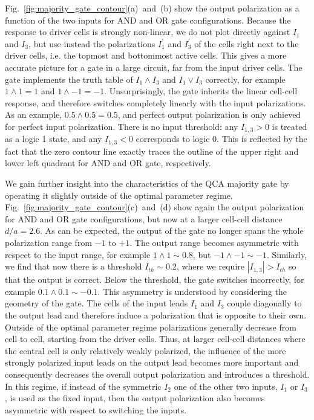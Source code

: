 Fig.~\ref{fig:majority_gate_contour}(a)~and~(b) show the output polarization as
a function of the two inputs for AND and OR gate configurations. Because the
response to driver cells is strongly non-linear, we do not plot directly against
$I_1$ and $I_3$, but use instead the polarizations $I_1^{\prime}$ and
$I_3^{\prime}$ of the cells right next to the driver cells, i.e.  the topmost
and bottommost active cells. This gives a more accurate picture for a gate in a
large circuit, far from the input driver cells. The gate implements the truth
table of $I_1 \land I_3$ and $I_1 \lor I_3$ correctly, for example $1 \land 1 =
1$ and $1 \land -1 = -1$. Unsurprisingly, the gate inherits the linear cell-cell
response, and therefore switches completely linearly with the input
polarizations. As an example, $0.5 \land 0.5 = 0.5$, and perfect output
polarization is only achieved for perfect input polarization. There is no input
threshold: any $I_{1,3} > 0$ is treated as a logic 1 state, and any $I_{1,3} <
0$ corresponds to logic 0. This is reflected by the fact that the zero contour
line exactly traces the outline of the upper right and lower left quadrant for
AND and OR gate, respectively.

We gain further insight into the characteristics of the QCA majority gate by
operating it slightly outside of the optimal parameter regime.
Fig.~\ref{fig:majority_gate_contour}(c)~and~(d) show again the output
polarization for AND and OR gate configurations, but now at a larger cell-cell
distance $d/a = 2.6$. As can be expected, the output of the gate no longer spans
the whole polarization range from $-1$ to $+1$. The output range becomes
asymmetric with respect to the input range, for example $1 \land 1 \sim 0.8$,
but $-1 \land -1 \sim -1$. Similarly, we find that now there is a threshold
$I_{th} \sim 0.2$, where we require $\left| I_{1,3} \right| > I_{th}$ so that
the output is correct. Below the threshold, the gate switches incorrectly, for
example $0.1 \land 0.1 \sim - 0.1$. This asymmetry is understood by considering
the geometry of the gate. The cells of the input leads $I_1$ and $I_3$ couple
diagonally to the output lead and therefore induce a polarization that is
opposite to their own. Outside of the optimal parameter regime polarizations
generally decrease from cell to cell, starting from the driver cells. Thus, at
larger cell-cell distances where the central cell is only relatively weakly
polarized, the influence of the more strongly polarized input leads on the
output lead becomes more important and consequently decreases the overall output
polarization and introduces a threshold. In this regime, if instead of the
symmetric $I_2$ one of the other two inputs, $I_1$ or $I_3$, is used as the
fixed input, then the output polarization also becomes asymmetric with respect
to switching the inputs.

